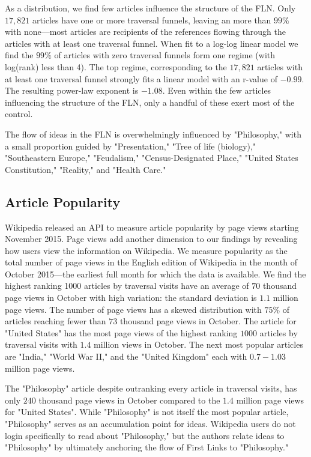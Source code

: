 \documentclass[pre,twocolumn,twoside,superscriptaddress,floatfix, aps, 10pt]{revtex4-1}
\begin{document}
As a distribution, we find few articles influence the structure of the 
FLN. Only $17, 821$ articles have one or more traversal funnels, leaving
an more than $99\%$ with none---most articles are recipients of 
the references flowing through the articles with at least one traversal funnel.
When fit to a log-log linear model we find the $99\%$ of articles with zero
traversal funnels form one regime (with log(rank) less than 4).
The top regime, corresponding to the $17, 821$ articles with at least one 
traversal funnel strongly fits a linear model with an r-value of $-0.99$. 
The resulting power-law exponent is $-1.08$. Even within the few articles
influencing the structure of the FLN, only a handful of these exert most of the 
control. 

The flow of ideas in the FLN is overwhelmingly influenced by "Philosophy,"
with a small proportion guided by "Presentation," "Tree of life (biology)," "Southeastern Europe," 
"Feudalism," "Census-Designated Place," "United States Constitution," "Reality," and "Health Care."



\subsection{Article Popularity}

Wikipedia released an API to measure article popularity by page views
starting November 2015. Page views add another dimension to our
findings by revealing 
how users view the information on Wikipedia. 
We measure popularity as the total number 
of page views in the English edition of Wikipedia in the month of 
October 2015---the earliest full month for which the data is available. 
We find the highest ranking 1000 articles by traversal visits have an average of
$70$ thousand page views in October with high variation: the standard deviation 
is $1.1$ million page views. 
The number of page views has a skewed distribution with $75\%$ of articles
reaching fewer than $73$ thousand page views in October.
The article for "United States" has the most page 
views of the highest ranking $1000$ articles by traversal visits with 
$1.4$ million views in October. The next most popular articles are 
"India," "World War II," and the "United Kingdom" each with $0.7-1.03$ million page views. 


The "Philosophy" article despite outranking every article in traversal visits,
has only $240$ thousand page views in October compared to the $1.4$ million
page views for "United States".
While "Philosophy" is not itself the most popular article, "Philosophy" serves as 
an accumulation point for ideas. Wikipedia users do not login specifically
to read about "Philosophy," but the authors relate ideas to "Philosophy" 
by ultimately anchoring the flow of First Links to "Philosophy."
\end{document}
